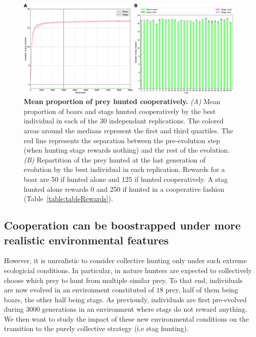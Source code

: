 
    \begin{figure}[h]
      \centering
        \includegraphics[width=1\linewidth]{fig/ArticleBio2/Fig1.png}
        \caption{\textbf{Mean proportion of prey hunted cooperatively.}
        \emph{(A)} Mean proportion of boars and stags hunted cooperatively by the best individual in each of the $30$ independant replications. The colored areas around the medians represent the first and third quartiles. The red line represents the separation between the pre-evolution step (when hunting stags rewards nothing) and the rest of the evolution. \emph{(B)} Repartition of the prey hunted at the last generation of evolution by the best individual in each replication. Rewards for a boar are 50 if hunted alone and 125 if hunted cooperatively. A stag hunted alone rewards 0 and 250 if hunted in a cooperative fashion (Table~\ref{table:tableRewards}).}
      \label{fig:figControl}
    \end{figure}

  \subsection{Cooperation can be boostrapped under more realistic environmental features}
    However, it is unrealistic to consider collective hunting only under such extreme ecologicial conditions. In particular, in nature hunters are expected to collectively choose which prey to hunt from multiple similar prey. To that end, individuals are now evolved in an environment constituted of $18$ prey, half of them being boars, the other half being stags. As previously, individuals are first pre-evolved during $3000$ generations in an environment where stags do not reward anything. We then want to study the impact of these new environmental conditions on the transition to the purely collective strategy (i.e stag hunting).

